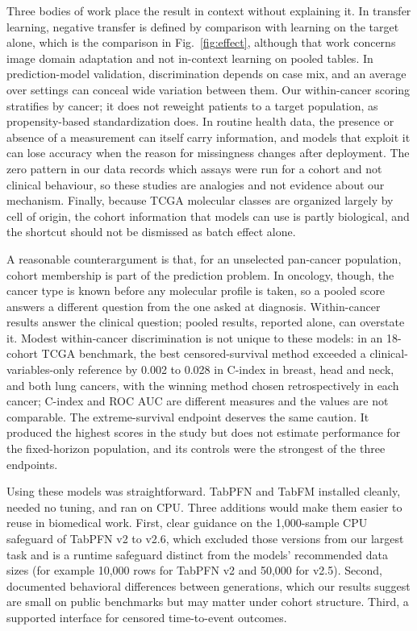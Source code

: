 \documentclass[11pt, a4paper, onecolumn, confidential, copyright]{hawkfranklin}
\begin{document}
Three bodies of work place the result in context without explaining it. In transfer learning, negative transfer is defined by comparison with learning on the target alone, which is the comparison in Fig.~\ref{fig:effect}, although that work concerns image domain adaptation and not in-context learning on pooled tables.\citep{wang2019characterizing} In prediction-model validation, discrimination depends on case mix, and an average over settings can conceal wide variation between them.\citep{dejong2023propensity,riley2016external} Our within-cancer scoring stratifies by cancer; it does not reweight patients to a target population, as propensity-based standardization does.\citep{dejong2023propensity} In routine health data, the presence or absence of a measurement can itself carry information, and models that exploit it can lose accuracy when the reason for missingness changes after deployment.\citep{sisk2021informative,rockenschaub2024robust} The zero pattern in our data records which assays were run for a cohort and not clinical behaviour, so these studies are analogies and not evidence about our mechanism. Finally, because TCGA molecular classes are organized largely by cell of origin,\citep{hoadley2018cell} the cohort information that models can use is partly biological, and the shortcut should not be dismissed as batch effect alone.

A reasonable counterargument is that, for an unselected pan-cancer population, cohort membership is part of the prediction problem. In oncology, though, the cancer type is known before any molecular profile is taken, so a pooled score answers a different question from the one asked at diagnosis. Within-cancer results answer the clinical question; pooled results, reported alone, can overstate it. Modest within-cancer discrimination is not unique to these models: in an 18-cohort TCGA benchmark, the best censored-survival method exceeded a clinical-variables-only reference by 0.002 to 0.028 in C-index in breast, head and neck, and both lung cancers, with the winning method chosen retrospectively in each cancer; C-index and ROC AUC are different measures and the values are not comparable.\citep{herrmann2021benchmark} The extreme-survival endpoint deserves the same caution. It produced the highest scores in the study but does not estimate performance for the fixed-horizon population, and its controls were the strongest of the three endpoints.

Using these models was straightforward. TabPFN and TabFM installed cleanly, needed no tuning, and ran on CPU. Three additions would make them easier to reuse in biomedical work. First, clear guidance on the 1,000-sample CPU safeguard of TabPFN v2 to v2.6, which excluded those versions from our largest task and is a runtime safeguard distinct from the models' recommended data sizes (for example 10,000 rows for TabPFN v2 and 50,000 for v2.5).\citep{hollmann2025accurate,priorlabs2025tabpfn25} Second, documented behavioral differences between generations, which our results suggest are small on public benchmarks but may matter under cohort structure. Third, a supported interface for censored time-to-event outcomes.
\end{document}
